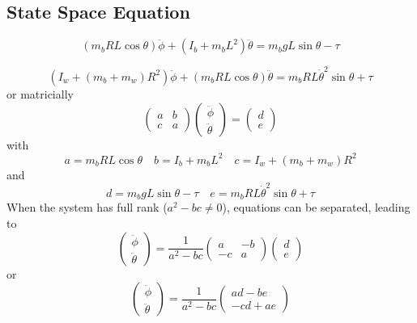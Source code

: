 \documentclass{article}
\begin{document}
\subsection{State Space Equation}

\begin{equation}
  (m_bRL\cos{\theta}) \ddot{\phi} + (I_b + m_bL^2) \ddot{\theta} = m_b g L \sin{\theta} - \tau
\end{equation}

\begin{equation}
  \left(I_w + (m_b+m_w)R^2\right) \ddot{\phi} + (m_b R L \cos{\theta}) \ddot{\theta}  = m_b R L \dot{\theta}^2 \sin{\theta} + \tau
\end{equation}
or matricially
\begin{equation}
  \begin{pmatrix}a & b \\ c & a \end{pmatrix} \begin{pmatrix}\ddot{\phi} \\ \ddot{\theta} \end{pmatrix} =
  \begin{pmatrix} d \\ e \end{pmatrix}
\end{equation}
with
\begin{equation}
  a = m_bRL\cos{\theta} \quad b = I_b + m_bL^2 \quad c = I_w + (m_b+m_w)R^2 
\end{equation}
and
\begin{equation}
  d = m_b g L \sin{\theta} - \tau \quad e =  m_b R L \dot{\theta}^2 \sin{\theta} + \tau
\end{equation}
When the system has full rank ($a^2-bc \ne 0$), equations can be separated, leading to
\begin{equation}
  \begin{pmatrix}\ddot{\phi} \\ \ddot{\theta} \end{pmatrix} =
  \frac{1}{a^2-bc}\begin{pmatrix}a & -b \\ -c & a \end{pmatrix}\begin{pmatrix} d \\ e \end{pmatrix}
\end{equation}
or
\begin{equation}
  \begin{pmatrix}\ddot{\phi} \\ \ddot{\theta} \end{pmatrix} =
  \frac{1}{a^2-bc}\begin{pmatrix} ad-be \\ -cd+ae\end{pmatrix}
\end{equation}
  
\end{document}

